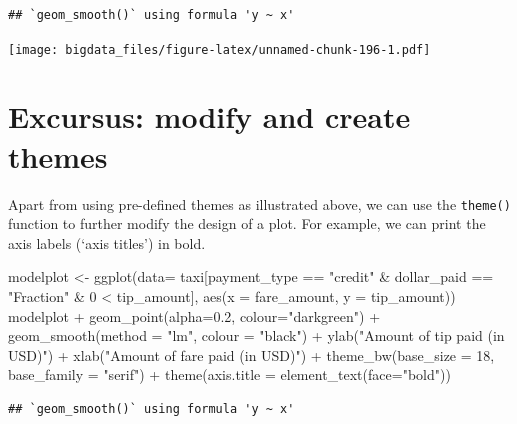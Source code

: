 \documentclass[
  12pt,
]{style/krantz}
\newenvironment{Shaded}{\begin{snugshade}}{\end{snugshade}}
\newcommand{\AttributeTok}[1]{\textcolor[rgb]{0.77,0.63,0.00}{#1}}
\newcommand{\DecValTok}[1]{\textcolor[rgb]{0.00,0.00,0.81}{#1}}
\newcommand{\FloatTok}[1]{\textcolor[rgb]{0.00,0.00,0.81}{#1}}
\newcommand{\FunctionTok}[1]{\textcolor[rgb]{0.00,0.00,0.00}{#1}}
\newcommand{\NormalTok}[1]{#1}
\newcommand{\OtherTok}[1]{\textcolor[rgb]{0.56,0.35,0.01}{#1}}
\newcommand{\SpecialCharTok}[1]{\textcolor[rgb]{0.00,0.00,0.00}{#1}}
\newcommand{\StringTok}[1]{\textcolor[rgb]{0.31,0.60,0.02}{#1}}
\begin{document}
\begin{verbatim}
## `geom_smooth()` using formula 'y ~ x'
\end{verbatim}

\texttt{[image: bigdata\_files/figure-latex/unnamed-chunk-196-1.pdf]}

\hypertarget{excursus-modify-and-create-themes}{%
\section{Excursus: modify and create themes}\label{excursus-modify-and-create-themes}}

Apart from using pre-defined themes as illustrated above, we can use the \texttt{theme()} function to further modify the design of a plot. For example, we can print the axis labels (`axis titles') in bold.

\begin{Shaded}
\begin{Highlighting}[]
\NormalTok{modelplot }\OtherTok{\textless{}{-}} \FunctionTok{ggplot}\NormalTok{(}\AttributeTok{data=}\NormalTok{ taxi[payment\_type }\SpecialCharTok{==} \StringTok{"credit"} \SpecialCharTok{\&}\NormalTok{ dollar\_paid }\SpecialCharTok{==} \StringTok{"Fraction"} \SpecialCharTok{\&} \DecValTok{0} \SpecialCharTok{\textless{}}\NormalTok{ tip\_amount],}
                    \FunctionTok{aes}\NormalTok{(}\AttributeTok{x =}\NormalTok{ fare\_amount, }\AttributeTok{y =}\NormalTok{ tip\_amount))}
\NormalTok{modelplot }\SpecialCharTok{+}
     \FunctionTok{geom\_point}\NormalTok{(}\AttributeTok{alpha=}\FloatTok{0.2}\NormalTok{, }\AttributeTok{colour=}\StringTok{"darkgreen"}\NormalTok{) }\SpecialCharTok{+}
     \FunctionTok{geom\_smooth}\NormalTok{(}\AttributeTok{method =} \StringTok{"lm"}\NormalTok{, }\AttributeTok{colour =} \StringTok{"black"}\NormalTok{) }\SpecialCharTok{+}
     \FunctionTok{ylab}\NormalTok{(}\StringTok{"Amount of tip paid (in USD)"}\NormalTok{) }\SpecialCharTok{+}
     \FunctionTok{xlab}\NormalTok{(}\StringTok{"Amount of fare paid (in USD)"}\NormalTok{) }\SpecialCharTok{+}
     \FunctionTok{theme\_bw}\NormalTok{(}\AttributeTok{base\_size =} \DecValTok{18}\NormalTok{, }\AttributeTok{base\_family =} \StringTok{"serif"}\NormalTok{) }\SpecialCharTok{+}
     \FunctionTok{theme}\NormalTok{(}\AttributeTok{axis.title =} \FunctionTok{element\_text}\NormalTok{(}\AttributeTok{face=}\StringTok{"bold"}\NormalTok{))}
\end{Highlighting}
\end{Shaded}

\begin{verbatim}
## `geom_smooth()` using formula 'y ~ x'
\end{verbatim}
\end{document}
